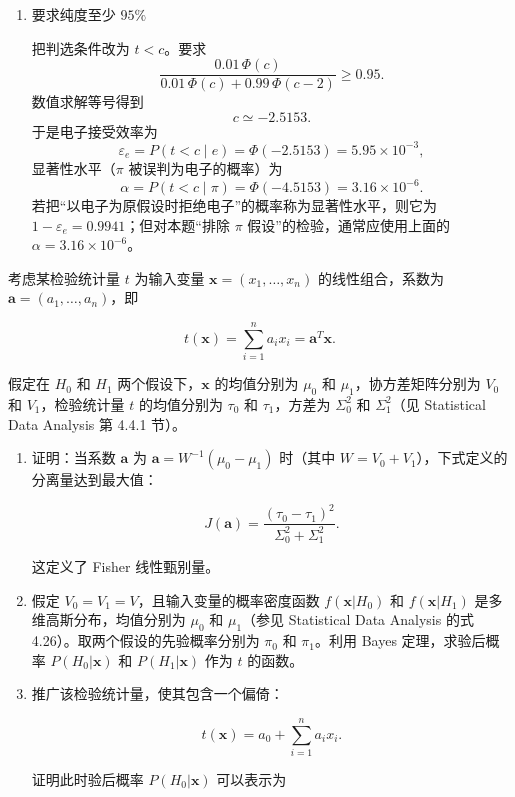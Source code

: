 \begin{question}
\begin{solution}
\begin{enumerate}
\item 要求纯度至少 \(95\%\)

把判选条件改为 \(t<c\)。要求
\[
\frac{0.01\,\Phi(c)}{0.01\,\Phi(c)+0.99\,\Phi(c-2)}\ge0.95.
\]
数值求解等号得到
\[
c\simeq -2.5153.
\]
于是电子接受效率为
\[
\varepsilon_e=P(t<c\mid e)=\Phi(-2.5153)=5.95\times10^{-3},
\]
显著性水平（\(\pi\) 被误判为电子的概率）为
\[
\alpha=P(t<c\mid\pi)=\Phi(-4.5153)=3.16\times10^{-6}.
\]
若把“以电子为原假设时拒绝电子”的概率称为显著性水平，则它为
\(1-\varepsilon_e=0.9941\)；但对本题“排除 \(\pi\) 假设”的检验，通常应使用上面的
\(\alpha=3.16\times10^{-6}\)。
\end{enumerate}
\end{solution}
\end{question}



\begin{question}
考虑某检验统计量 \(t\) 为输入变量 \(\mathbf{x}=(x_1,\ldots,x_n)\)
的线性组合，系数为 \(\mathbf{a}=(a_1,\ldots,a_n)\)，即

\[
t(\mathbf{x})=\sum_{i=1}^{n}a_i x_i=\mathbf{a}^T\mathbf{x}.
\]

假定在 \(H_0\) 和 \(H_1\) 两个假设下，\(\mathbf{x}\) 的均值分别为
\(\mu_0\) 和 \(\mu_1\)，协方差矩阵分别为 \(V_0\) 和 \(V_1\)，检验统计量
\(t\) 的均值分别为 \(\tau_0\) 和 \(\tau_1\)，方差为 \(\Sigma_0^2\) 和
\(\Sigma_1^2\)（见 Statistical Data Analysis 第 4.4.1 节）。

\begin{enumerate}
\item 证明：当系数 \(\mathbf{a}\) 为 \(\mathbf{a}=W^{-1}(\mu_0-\mu_1)\)
时（其中 \(W=V_0+V_1\)），下式定义的分离量达到最大值：

\[
J(\mathbf{a})=\frac{(\tau_0-\tau_1)^2}{\Sigma_0^2+\Sigma_1^2}.
\]

这定义了 Fisher 线性甄别量。

\item 假定 \(V_0=V_1=V\)，且输入变量的概率密度函数 \(f(\mathbf{x}|H_0)\)
和 \(f(\mathbf{x}|H_1)\) 是多维高斯分布，均值分别为 \(\mu_0\) 和
\(\mu_1\)（参见 Statistical Data Analysis 的式
4.26）。取两个假设的先验概率分别为 \(\pi_0\) 和 \(\pi_1\)。利用 Bayes
定理，求验后概率 \(P(H_0|\mathbf{x})\) 和 \(P(H_1|\mathbf{x})\) 作为
\(t\) 的函数。

\item 推广该检验统计量，使其包含一个偏倚：

\[
t(\mathbf{x})=a_0+\sum_{i=1}^{n}a_i x_i.
\]

证明此时验后概率 \(P(H_0|\mathbf{x})\) 可以表示为


\end{enumerate}
\end{question}
